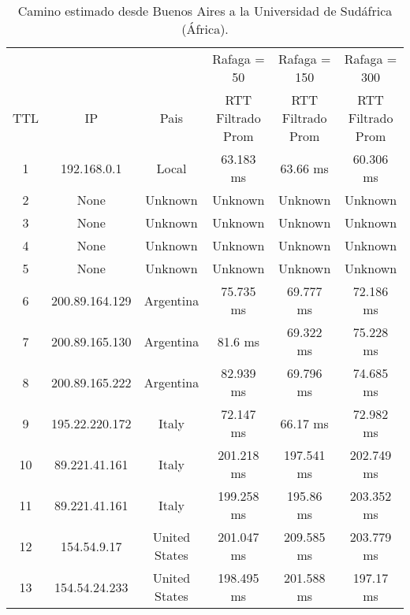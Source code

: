 
\begin{table}[]
\centering
\caption{Camino estimado desde Buenos Aires a la Universidad de Sudáfrica (África).}
\begin{tabular}{ | c | c | c | c | c | c | }
	\hline 
  & & & Rafaga = 50 & Rafaga = 150 &Rafaga = 300  \\ %
  TTL	&         IP        & 	        Pais      &  	 RTT Filtrado Prom  &	 RTT Filtrado Prom  & RTT Filtrado Prom  \\ \hline  
  1	&192.168.0.1        & 	       Local      &  	      63.183 ms     &	       63.66 ms     &      60.306 ms     \\ \hline  
  2	&None               & 	      Unknown     &  	      Unknown       &	      Unknown       &      Unknown       \\ \hline  
  3	&None               & 	      Unknown     &  	      Unknown       &	      Unknown       &      Unknown       \\ \hline  
  4	&None               & 	      Unknown     &  	      Unknown       &	      Unknown       &      Unknown       \\ \hline  
  5	&None               & 	      Unknown     &  	      Unknown       &	      Unknown       &      Unknown       \\ \hline  
  6	&200.89.164.129     & 	     Argentina    &  	      75.735 ms     &	      69.777 ms     &      72.186 ms     \\ \hline  
  7	&200.89.165.130     & 	     Argentina    &  	        81.6 ms     &	      69.322 ms     &      75.228 ms     \\ \hline  
  8	&200.89.165.222     & 	     Argentina    &  	      82.939 ms     &	      69.796 ms     &      74.685 ms     \\ \hline  
  9	&195.22.220.172     & 	       Italy      &  	      72.147 ms     &	       66.17 ms     &      72.982 ms     \\ \hline  
  10	&89.221.41.161      & 	       Italy      &  	     201.218 ms     &	     197.541 ms     &     202.749 ms     \\ \hline  
  11	&89.221.41.161      & 	       Italy      &  	     199.258 ms     &	      195.86 ms     &     203.352 ms     \\ \hline  
  12	&154.54.9.17        & 	   United States  &  	     201.047 ms     &	     209.585 ms     &     203.779 ms     \\ \hline  
  13	&154.54.24.233      & 	   United States  &  	     198.495 ms     &	     201.588 ms     &      197.17 ms     \\ \hline  

\end{tabular}
\end{table}
